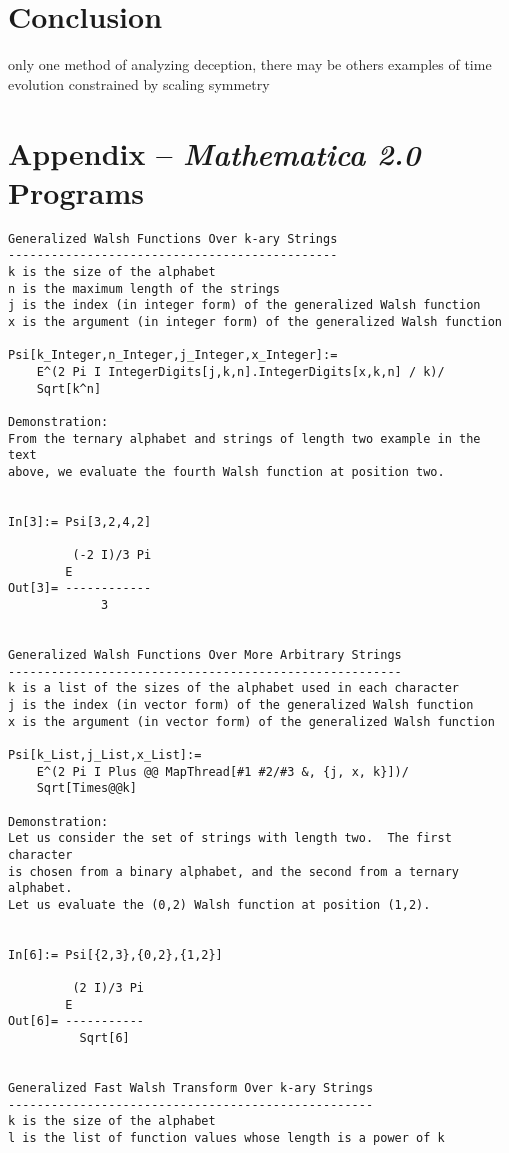 \section{Conclusion}
only one method of analyzing deception, there may be others
examples of time evolution constrained by scaling symmetry

\appendix
\section{Appendix -- {\em Mathematica 2.0\/} Programs}


\begin{verbatim}
Generalized Walsh Functions Over k-ary Strings
----------------------------------------------
k is the size of the alphabet
n is the maximum length of the strings
j is the index (in integer form) of the generalized Walsh function
x is the argument (in integer form) of the generalized Walsh function

Psi[k_Integer,n_Integer,j_Integer,x_Integer]:=
	E^(2 Pi I IntegerDigits[j,k,n].IntegerDigits[x,k,n] / k)/
	Sqrt[k^n]

Demonstration:
From the ternary alphabet and strings of length two example in the text
above, we evaluate the fourth Walsh function at position two.


In[3]:= Psi[3,2,4,2]

         (-2 I)/3 Pi
        E
Out[3]= ------------
             3


Generalized Walsh Functions Over More Arbitrary Strings
-------------------------------------------------------
k is a list of the sizes of the alphabet used in each character
j is the index (in vector form) of the generalized Walsh function
x is the argument (in vector form) of the generalized Walsh function

Psi[k_List,j_List,x_List]:=
	E^(2 Pi I Plus @@ MapThread[#1 #2/#3 &, {j, x, k}])/
	Sqrt[Times@@k]

Demonstration:
Let us consider the set of strings with length two.  The first character
is chosen from a binary alphabet, and the second from a ternary alphabet.
Let us evaluate the (0,2) Walsh function at position (1,2).


In[6]:= Psi[{2,3},{0,2},{1,2}]

         (2 I)/3 Pi
        E
Out[6]= -----------
          Sqrt[6]


Generalized Fast Walsh Transform Over k-ary Strings
---------------------------------------------------
k is the size of the alphabet
l is the list of function values whose length is a power of k


\end{verbatim}

